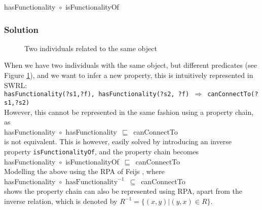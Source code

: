 \noindent
hasFunctionality~\ensuremath{\circ}~isFunctionalityOf

\subsubsection{Solution}

\begin{figure}[bth]
	\caption{Two individuals related to the same object}
	\label{canConnectTo2}        
\end{figure}

When we have two individuals with the same object, but different predicates (see Figure \ref{canConnectTo2}), and we want to infer a new property, this is intuitively represented in \ac{SWRL}: \\

\noindent
\texttt{hasFunctionality(?s1,?f), hasFunctionality(?s2, ?f) $\Rightarrow$ canConnectTo(?s1,?s2)}\\

However, this cannot be represented in the same fashion using a property chain, as\\ 

\noindent
hasFunctionality~\ensuremath{\circ}~hasFunctionality~\ensuremath{\sqsubseteq}~canConnectTo\\

is not equivalent. This is however, easily solved by introducing an inverse property \texttt{isFunctionalityOf}, and the property chain becomes\\

\noindent
hasFunctionality~\ensuremath{\circ}~isFunctionalityOf~\ensuremath{\sqsubseteq}~canConnectTo\\

Modelling the above using the \ac{RPA} of Feijs \cite{Feijs1999}, where\\
\label{RPA}
\noindent
hasFunctionality~\ensuremath{\circ}~$\text{hasFunctionality}^{-1}$~\ensuremath{\subseteq}~canConnectTo\\

shows the property chain can also be represented using \ac{RPA}, apart from the inverse relation, which is denoted by  $R^{-1} = \{ (x,y) | (y,x) \in R \}$.

